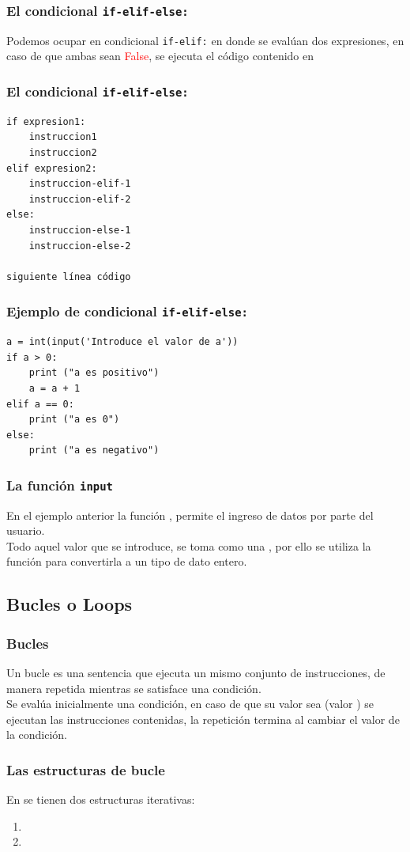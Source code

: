 \documentclass[12pt]{beamer}
\begin{document}
\begin{frame}[fragile]
\frametitle{El condicional \texttt{if-elif-else:}}
Podemos ocupar en condicional \texttt{if-elif:} en donde se evalúan dos expresiones, en caso de que ambas sean \textcolor{red}{False}, se ejecuta el código contenido en 
\end{frame}
\begin{frame}[fragile]
\frametitle{El condicional \texttt{if-elif-else:}}
\fontsize{12}{12}\selectfont
\begin{verbatim}
if expresion1:
    instruccion1
    instruccion2
elif expresion2:
    instruccion-elif-1
    instruccion-elif-2
else:
    instruccion-else-1
    instruccion-else-2

siguiente línea código
\end{verbatim}
\end{frame}
\begin{frame}[fragile]
\frametitle{Ejemplo de condicional \texttt{if-elif-else:}}
\begin{lstlisting}[caption=Ejemplo de un condicionla if-elif-else]
a = int(input('Introduce el valor de a'))
if a > 0:
    print ("a es positivo")
    a = a + 1
elif a == 0: 
    print ("a es 0")
else:
    print ("a es negativo")
\end{lstlisting}
\end{frame}
\begin{frame}
\frametitle{La función \texttt{input}}
En el ejemplo anterior la función , permite el ingreso de datos por parte del usuario.
\\
\bigskip
\pause
Todo aquel valor que se introduce, se toma como una , por ello se utiliza la función  para convertirla a un tipo de dato entero.
\end{frame}

\subsection{Bucles o Loops}

\begin{frame}
\frametitle{Bucles}
Un bucle es una sentencia que ejecuta un mismo conjunto de instrucciones, de manera repetida mientras se satisface una condición.
\\
\bigskip
Se evalúa inicialmente una condición, en caso de que su valor sea (valor ) se ejecutan las instrucciones contenidas, \pause la repetición termina al cambiar el valor de la condición.
\end{frame}
\begin{frame}
\frametitle{Las estructuras de bucle}
En \python{} se tienen dos estructuras iterativas:
\begin{enumerate}[<+->]
\item {}
\item {}
\end{enumerate}
\end{frame}
\end{document}
